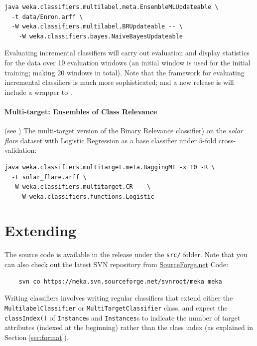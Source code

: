 \documentclass[11pt]{article}
\newcommand{\MEKA}{Meka}
\newcommand{\MOA}{Moa}
\newcommand{\WEKA}{Weka}
\begin{document}
\begin{verbatim}
java weka.classifiers.multilabel.meta.EnsembleMLUpdateable \
  -t data/Enron.arff \
  -W weka.classifiers.multilabel.BRUpdateable -- \
    -W weka.classifiers.bayes.NaiveBayesUpdateable
\end{verbatim}

Evaluating incremental classifiers will carry out evaluation and display statistics for the data over 19 evaluation windows (an initial window is used for the initial training; making 20 windows in total). Note that the \framework{\MOA} framework \cite{MOA} for evaluating incremental classifiers is much more sophisticated; and a new release is will include a wrapper to \framework{\MEKA}. 

\paragraph{Multi-target: Ensembles of Class Relevance} (see \cite{UPM}) The multi-target version of the Binary Relevance classifier) on the \textit{solar flare} dataset with Logistic Regression as a base classifier under $5$-fold cross-validation:
\begin{verbatim}
java weka.classifiers.multitarget.meta.BaggingMT -x 10 -R \
  -t solar_flare.arff \
  -W weka.classifiers.multitarget.CR -- \
    -W weka.classifiers.functions.Logistic
\end{verbatim}


\section{\label{sec:extending}Extending \framework{\MEKA}}%

The source code is available in the release under the \texttt{src/} folder. Note that you can also check out the latest SVN repository from \url{SourceForge.net} \textsf{Code}: 
\begin{verbatim}
	svn co https://meka.svn.sourceforge.net/svnroot/meka meka 
\end{verbatim}

Writing \framework{\MEKA} classifiers involves writing regular \framework{\WEKA} classifiers that extend either the \texttt{MultilabelClassifier} or \texttt{MultiTargetClassifier} class, and expect the \texttt{classIndex()} of \texttt{Instance}s and \texttt{Instances}s to indicate the number of target attributes (indexed at the beginning) rather than the class index (as explained in Section \ref{sec:format}). 
\end{document}
